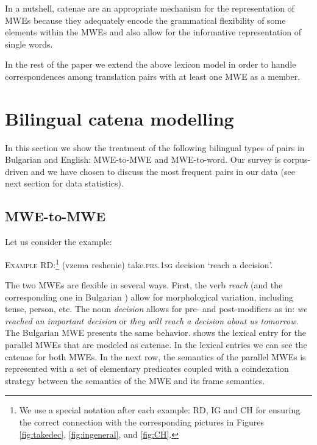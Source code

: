 \documentclass[output=paper]{langsci/langscibook}
\begin{document}
\largerpage
In a nutshell, catenae are an appropriate mechanism for the representation of MWEs because they adequately encode the grammatical flexibility of some elements within the MWEs and also allow for the informative representation of single words.


In the rest of the paper we extend the above lexicon model in order to
handle correspondences among translation pairs with at least one MWE as a member.



\section{Bilingual catena modelling}
\label{Sec:BCatenae}

In this section we show the treatment of the following bilingual types of
pairs in Bulgarian and English: MWE-to-MWE and MWE-to-word. Our survey is
corpus-driven and we have chosen to discuss the most frequent pairs in our
data (see next section for data statistics).

\subsection{ MWE-to-MWE}

Let us consider the example:

\ea
\textsc{Example RD:}\footnote{We use a special notation after each example: RD,
IG and CH for ensuring the correct connection with the corresponding
pictures in Figures
\ref{fig:takedec}, \ref{fig:ingeneral}, and \ref{fig:CH}.} 
\textit{} (vzema reshenie) take.\textsc{prs.1sg} decision `reach a decision'.
\z

The two MWEs are flexible in several ways. First, the verb \textit{reach} (and the corresponding one in Bulgarian ) allow for morphological variation, including tense, person, etc. The noun \textit{decision} allows for pre- and post-modifiers as in: {\em we reached an important decision} or {\em they will reach a decision about us tomorrow}. The Bulgarian MWE presents the same behavior.  shows the lexical entry for the parallel MWEs that are modeled as catenae. In the lexical entries we can see the catenae for both MWEs. In the next row, the semantics of the parallel MWEs is represented with a set of elementary predicates coupled with a coindexation strategy between the semantics of the MWE and its frame semantics.
\end{document}
